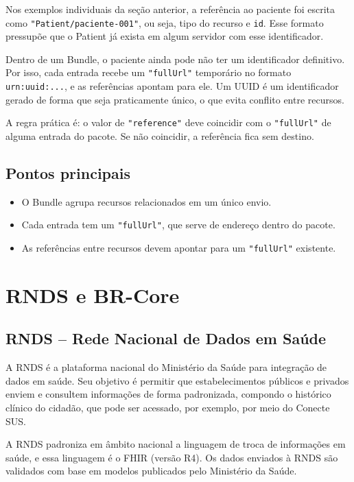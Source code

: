 \documentclass[11pt,a4paper]{article}
\newcommand{\codigo}[1]{\texttt{#1}}
\begin{document}
Nos exemplos individuais da seção anterior, a referência ao paciente foi
escrita como \codigo{"Patient/paciente-001"}, ou seja, tipo do recurso e
\codigo{id}. Esse formato pressupõe que o Patient já exista em algum
servidor com esse identificador.

Dentro de um Bundle, o paciente ainda pode não ter um identificador
definitivo. Por isso, cada entrada recebe um \codigo{"fullUrl"} temporário
no formato \codigo{urn:uuid:...}, e as referências apontam para ele. Um UUID
é um identificador gerado de forma que seja praticamente único, o que evita
conflito entre recursos.

A regra prática é: o valor de \codigo{"reference"} deve coincidir com o
\codigo{"fullUrl"} de alguma entrada do pacote. Se não coincidir, a
referência fica sem destino.

\subsection*{Pontos principais}

\begin{itemize}
  \item O Bundle agrupa recursos relacionados em um único envio.
  \item Cada entrada tem um \codigo{"fullUrl"}, que serve de endereço
    dentro do pacote.
  \item As referências entre recursos devem apontar para um
    \codigo{"fullUrl"} existente.
\end{itemize}

\section{RNDS e BR-Core}

\subsection{RNDS -- Rede Nacional de Dados em Saúde}

A RNDS é a plataforma nacional do Ministério da Saúde para integração de
dados em saúde. Seu objetivo é permitir que estabelecimentos públicos e
privados enviem e consultem informações de forma padronizada, compondo o
histórico clínico do cidadão, que pode ser acessado, por exemplo, por meio
do Conecte SUS.

A RNDS padroniza em âmbito nacional a linguagem de troca de informações em
saúde, e essa linguagem é o FHIR (versão R4). Os dados enviados à RNDS são
validados com base em modelos publicados pelo Ministério da Saúde.
\end{document}
